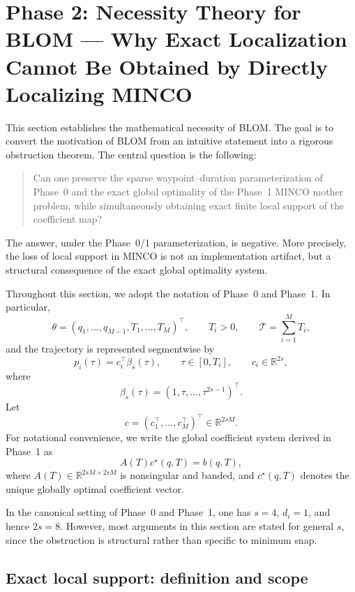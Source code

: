 \section{Phase 2: Necessity Theory for BLOM --- Why Exact Localization Cannot Be Obtained by Directly Localizing MINCO}
\label{sec:phase2_necessity}

This section establishes the mathematical necessity of BLOM.
The goal is to convert the motivation of BLOM from an intuitive statement into a rigorous obstruction theorem.
The central question is the following:

\begin{quote}
Can one preserve the sparse waypoint--duration parameterization of Phase~0 and the exact global optimality of the Phase~1 MINCO mother problem, while simultaneously obtaining exact finite local support of the coefficient map?
\end{quote}

The answer, under the Phase~0/1 parameterization, is negative.
More precisely, the loss of local support in MINCO is not an implementation artifact, but a structural consequence of the exact global optimality system.

Throughout this section, we adopt the notation of Phase~0 and Phase~1.
In particular,
\[
\theta=(q_1,\dots,q_{M-1},T_1,\dots,T_M)^\top,
\qquad
T_i>0,
\qquad
\mathcal T=\sum_{i=1}^{M}T_i,
\]
and the trajectory is represented segmentwise by
\[
p_i(\tau)=c_i^\top \beta_s(\tau),
\qquad
\tau\in[0,T_i],
\qquad
c_i\in\mathbb R^{2s},
\]
where
\[
\beta_s(\tau)=(1,\tau,\dots,\tau^{2s-1})^\top.
\]
Let
\[
c=(c_1^\top,\dots,c_M^\top)^\top\in\mathbb R^{2sM}.
\]
For notational convenience, we write the global coefficient system derived in Phase~1 as
\begin{equation}
\label{eq:phase2_global_system}
A(T)c^\star(q,T)=b(q,T),
\end{equation}
where \(A(T)\in\mathbb R^{2sM\times 2sM}\) is nonsingular and banded, and \(c^\star(q,T)\) denotes the unique globally optimal coefficient vector.

In the canonical setting of Phase~0 and Phase~1, one has \(s=4\), \(d_i=1\), and hence \(2s=8\).
However, most arguments in this section are stated for general \(s\), since the obstruction is structural rather than specific to minimum snap.

\subsection{Exact local support: definition and scope}
\label{subsec:phase2_local_support_def}

